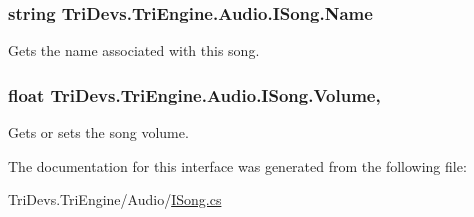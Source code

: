 \hypertarget{interface_tri_devs_1_1_tri_engine_1_1_audio_1_1_i_song_a91fdaeb52931f21f1d9b98e5ea49523e}{
\subsubsection[{Name}]{\setlength{\rightskip}{0pt plus 5cm}string Tri\-Devs.\-Tri\-Engine.\-Audio.\-I\-Song.\-Name\hspace{0.3cm}{\ttfamily [get]}}}\label{interface_tri_devs_1_1_tri_engine_1_1_audio_1_1_i_song_a91fdaeb52931f21f1d9b98e5ea49523e}


Gets the name associated with this song. 

\hypertarget{interface_tri_devs_1_1_tri_engine_1_1_audio_1_1_i_song_aca29bef6067582a446c872d86b8b7130}{
\subsubsection[{Volume}]{\setlength{\rightskip}{0pt plus 5cm}float Tri\-Devs.\-Tri\-Engine.\-Audio.\-I\-Song.\-Volume\hspace{0.3cm}{\ttfamily [get]}, {\ttfamily [set]}}}\label{interface_tri_devs_1_1_tri_engine_1_1_audio_1_1_i_song_aca29bef6067582a446c872d86b8b7130}


Gets or sets the song volume. 



The documentation for this interface was generated from the following file\-:\begin{DoxyCompactItemize}
\item 
Tri\-Devs.\-Tri\-Engine/\-Audio/\hyperlink{_i_song_8cs}{I\-Song.\-cs}\end{DoxyCompactItemize}
